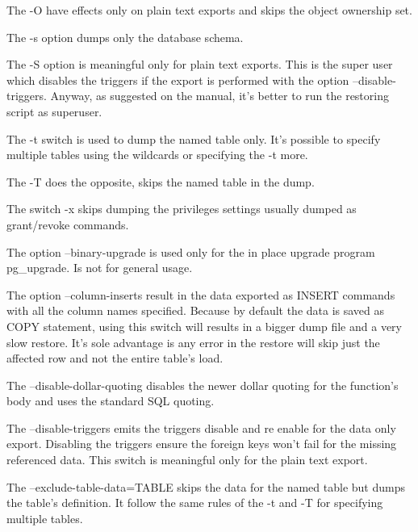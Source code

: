 The -O have effects only on plain text exports and skips the object ownership set.\newline

The -s option dumps only the database schema.\newline


The -S option is meaningful only for plain text exports. This is the super user which disables the 
triggers if the export is performed with the option --disable-triggers. Anyway, as suggested on the 
manual, it's better to run the restoring script as superuser.\newline

The -t switch is used to dump the named table only. It's possible to specify multiple tables using 
the wildcards or specifying the -t more.\newline

The -T does the opposite, skips the named table in the dump.\newline

The switch -x skips dumping the privileges settings usually dumped as grant/revoke commands.\newline

The option --binary-upgrade is used only for the in place upgrade program pg\_upgrade. Is not 
for general usage. 

The option --column-inserts result in the data exported as INSERT commands with all the column 
names specified. Because by default the data is saved as COPY statement, using this switch will 
results in a bigger dump file and a very slow restore. It's sole advantage is any error in the 
restore will skip just the affected row and not the entire table's load.\newline

The --disable-dollar-quoting disables the newer dollar quoting for the function's body and uses the 
standard SQL quoting.\newline

The --disable-triggers emits the triggers disable 
and re enable for the data only export. Disabling the triggers ensure the foreign keys won't fail 
for the missing referenced data. This switch is meaningful only for the plain text export.\newline

The --exclude-table-data=TABLE skips the data for the named table but dumps the table's definition. 
It follow the same rules of the -t and -T for specifying multiple tables.\newline


